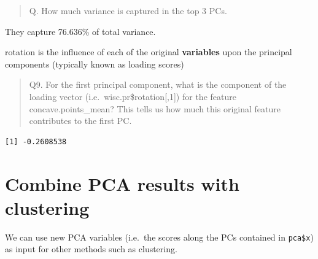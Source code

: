 \documentclass[
  letterpaper,
  DIV=11,
  numbers=noendperiod]{scrartcl}
\newenvironment{Shaded}{\begin{snugshade}}{\end{snugshade}}
\newcommand{\AttributeTok}[1]{\textcolor[rgb]{0.40,0.45,0.13}{#1}}
\newcommand{\CommentTok}[1]{\textcolor[rgb]{0.37,0.37,0.37}{#1}}
\newcommand{\DecValTok}[1]{\textcolor[rgb]{0.68,0.00,0.00}{#1}}
\newcommand{\FunctionTok}[1]{\textcolor[rgb]{0.28,0.35,0.67}{#1}}
\newcommand{\NormalTok}[1]{\textcolor[rgb]{0.00,0.23,0.31}{#1}}
\newcommand{\OtherTok}[1]{\textcolor[rgb]{0.00,0.23,0.31}{#1}}
\newcommand{\SpecialCharTok}[1]{\textcolor[rgb]{0.37,0.37,0.37}{#1}}
\newcommand{\StringTok}[1]{\textcolor[rgb]{0.13,0.47,0.30}{#1}}
\begin{document}
\begin{quote}
Q. How much variance is captured in the top 3 PCs.
\end{quote}

They capture 76.636\% of total variance.

rotation is the influence of each of the original \textbf{variables}
upon the principal components (typically known as loading scores)

\begin{quote}
Q9. For the first principal component, what is the component of the
loading vector (i.e.~wisc.pr\$rotation{[},1{]}) for the feature
concave.points\_mean? This tells us how much this original feature
contributes to the first PC.
\end{quote}

\begin{Shaded}
\end{Shaded}

\begin{verbatim}
[1] -0.2608538
\end{verbatim}

\hypertarget{combine-pca-results-with-clustering}{%
\section{Combine PCA results with
clustering}\label{combine-pca-results-with-clustering}}

We can use new PCA variables (i.e.~the scores along the PCs contained in
\texttt{pca\$x}) as input for other methods such as clustering.

\begin{Shaded}
\end{Shaded}
\end{document}
